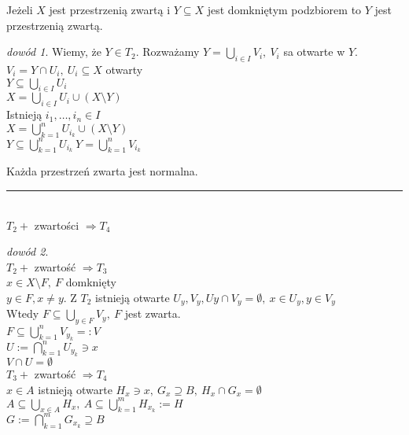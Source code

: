 \documentclass[twoside,10pt]{article}
\theoremstyle{definition}
\theoremstyle{definition}
\theoremstyle{definition}
\theoremstyle{definition}
\theoremstyle{remark}
\newtheorem*{dd}{dowód}
\theoremstyle{definition}
\theoremstyle{definition}
\theoremstyle{definition}
\theoremstyle{definition}
\theoremstyle{definition}
\theoremstyle{definition}
\begin{document}
\begin{lem} 
    Jeżeli $X$ jest przestrzenią zwartą i $Y \subseteq X$ jest domkniętym podzbiorem to 
    $Y$ jest przestrzenią zwartą. 
    \begin{dd} 
        Wiemy, że $Y \in T_2$. Rozważamy $Y = \bigcup\limits_{i \in I} V_i,\ V_i$ sa
        otwarte w $Y$. \\ 
        $V_i = Y \cap U_i,\ U_i \subseteq X$ otwarty \\ 
        $Y \subseteq \bigcup\limits_{i \in I} U_i$ \\ 
        $X = \bigcup\limits_{i \in I} U_i \cup (X \setminus Y)$ \\ 
        Istnieją $i_1,\ldots,i_n \in I$ \\ 
        $X = \bigcup\limits_{k = 1}^n U_{i_k} \cup (X \setminus Y)$ \\ 
        $Y \subseteq \bigcup\limits_{k=1}^n U_{i_k} \ Y = \bigcup\limits_{k=1}^n V_{i_k}$
    \end{dd} 
\end{lem} 
\begin{tw} 
    Każda przestrzeń zwarta jest normalna. \\ 
    \rule{2cm}{0.4pt} \\
    \footnotesize{$T_2 + $ zwartości $\Rightarrow T_4$}
\end{tw} 
\begin{dd} ~\\ 
    $T_2 +$ zwartość $\Rightarrow T_3$ \\ 
    $x \in X \setminus F,\ F$ domknięty \\
    $y \in F, x \neq y$. Z $T_2$ istnieją otwarte $U_y, V_y, Uy
    \cap V_y = \emptyset,\ x \in U_y, y \in V_y$ \\ 
    Wtedy $F \subseteq \bigcup\limits_{y \in F} V_y,\ F$ jest zwarta. \\ 
    $F \subseteq \bigcup\limits_{k=1}^n V_{y_k} =: V$ \\ 
    $U := \bigcap\limits_{k=1}^n U_{y_k} \ni x$ \\
    $V \cap U = \emptyset$ \\ 
    $T_3 +$ zwartość $\Rightarrow T_4$ \\ 
    $x \in A$ istnieją otwarte $H_x \ni x,\ G_x \supseteq B,\ H_x \cap G_x = \emptyset$ \\
    $A \subseteq \bigcup\limits_{x \in A} H_x, \ A \subseteq \bigcup\limits_{k=1}^m
    H_{x_k} := H$ \\ 
    $G := \bigcap\limits_{k=1}^m G_{x_k} \supseteq B$
\end{dd} 
\end{document}
